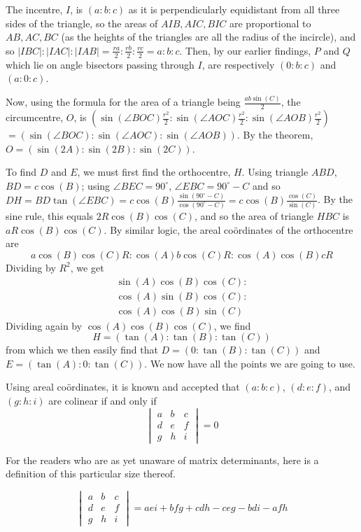 The incentre, \(I\), is \((a:b:c)\) as it is perpendicularly equidistant from all three sides of the triangle, so the areas of \(AIB, AIC, BIC\) are proportional to \(AB, AC, BC\) (as the heights of the triangles are all the radius of the incircle), and so \(|IBC|:|IAC|:|IAB|=\frac{ra}{2}:\frac{rb}{2}:\frac{rc}{2}=a:b:c\). Then, by our earlier findings, \(P\) and \(Q\) which lie on angle bisectors passing through \(I\), are respectively \((0:b:c)\) and \((a:0:c)\).

Now, using the formula for the area of a triangle being \(\frac{ab\sin(C)}{2}\), the circumcentre, \(O\), is \((\sin(\angle{}BOC)\frac{r^2}{2}:\sin(\angle{}AOC)\frac{r^2}{2}:\sin(\angle{}AOB)\frac{r^2}{2})\) \(=(\sin(\angle{}BOC):\sin(\angle{}AOC):\sin(\angle{}AOB))\). By the  theorem, \(O=(\sin(2A):\sin(2B):\sin(2C))\).

To find \(D\) and \(E\), we must first find the orthocentre, \(H\). Using triangle \(ABD\), \(BD=c\cos(B)\); using \(\angle{}BEC=90^{\circ}\), \(\angle{}EBC=90^{\circ}-C\) and so \(DH=BD\tan(\angle{}EBC)=c\cos(B)\frac{\sin(90^{\circ}-C)}{\cos(90^{\circ}-C)}=c\cos(B)\frac{\cos(C)}{\sin(C)}\). By the sine rule, this equals \(2R\cos(B)\cos(C)\), and so the area of triangle \(HBC\) is \(aR\cos(B)\cos(C)\). By similar logic, the areal coördinates of the orthocentre are
\[a\cos(B)\cos(C)R:\cos(A)b\cos(C)R:\cos(A)\cos(B)cR\]
Dividing by \(R^2\), we get
\[\begin{split}
\sin(A)\cos(B)\cos(C):\\
\cos(A)\sin(B)\cos(C):\\
\cos(A)\cos(B)\sin(C)
\end{split}\]
Dividing again by \(\cos(A)\cos(B)\cos(C)\), we find
\[H=(\tan(A):\tan(B):\tan(C))\]
from which we then easily find that \(D=(0:\tan(B):\tan(C))\) and \(E=(\tan(A):0:\tan(C))\). We now have all the points we are going to use.

Using areal coördinates, it is known and accepted that \((a:b:c)\), \((d:e:f)\), and \((g:h:i)\) are colinear if and only if
\[
\begin{vmatrix}
a&b&c\\
d&e&f
\\g&h&i
\end{vmatrix}=0
\]

For the readers who are as yet unaware of matrix determinants, here is a definition of this particular size thereof.

\[
\begin{vmatrix}
a&b&c\\
d&e&f
\\g&h&i
\end{vmatrix}=aei+bfg+cdh-ceg-bdi-afh
\]

